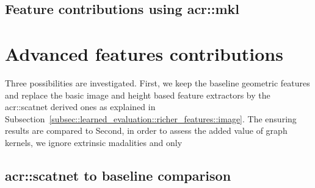     \subsection{Feature contributions using \acrshort*{acr::mkl}}
        \begin{figure}[htpb]
            \centering
        \end{figure}
    
\section{Advanced features contributions}
    \label{sec::more_experiments::richer_features}
    Three possibilities are investigated.
    First, we keep the baseline geometric features and replace the basic image and height based feature extractors by the \gls{acr::scatnet} derived ones as explained in Subsection~\ref{subsec::learned_evaluation::richer_features::image}.
    The ensuring results are compared to 
    Second, in order to assess the added value of graph kernels, we ignore extrinsic madalities and only 

    \subsection{\acrshort*{acr::scatnet} to baseline comparison}
        \label{subsec::more_experiments::richer_features::scatnet_baseline}

